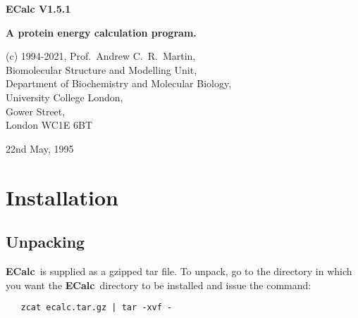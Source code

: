 \documentclass[12pt]{article}
\newcommand{\ecalc}{\mbox{\bf ECalc}}
\newcommand{\ec}{\mbox{\bf EC}}
\begin{document}
\begin{center}
{\Large\bf ECalc V1.5.1}
\large

{\bf A protein energy calculation program.}
\vspace{1em}

(c) 1994-2021, Prof.\ Andrew C.\ R.\ Martin,\\
Biomolecular Structure and Modelling Unit,\\
Department of Biochemistry and Molecular Biology,\\
University College London,\\
Gower Street,\\
London WC1E 6BT\\
\vspace{1em}

22nd May, 1995
\vspace{2em}

\end{center}

\begin{abstract}
   \ecalc\ is a program designed to calculate the energy of a protein. It
may also be used to calculate the energies of a number of conformations 
of a region within a protein. The calculations may be restricted to
the region of interest (though non-bonded contacts with other parts of
the protein will also be considered). In addition, other parts of the
protein may be specified which should be excluded from consideration
in the non-bonded contact calculations. Parts of the potential may be
switched on or off and scaled with respect to one another. This
allows, for example, the simple calculation of just the van der Waals
repulsion or just the bond energy.

   The program may be run using a control file (as described below),
or using an X-windows interface (\ec) on machines equipped with the
Tcl/Tk package. This interface builds a control file and spawns the
normal \ecalc\ program to perform the calculations.
\end{abstract}


\section{Installation}


\subsection{Unpacking}
\ecalc\ is supplied as a gzipped tar file. To unpack, go to the directory
in which you want the \ecalc\ directory to be installed and issue the
command:
\begin{verbatim}
   zcat ecalc.tar.gz | tar -xvf -
\end{verbatim}
\end{document}
